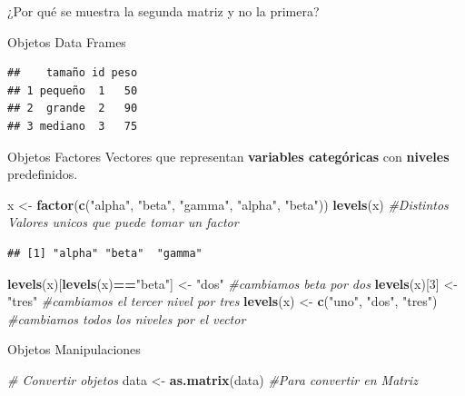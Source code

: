 \documentclass[
  ignorenonframetext,
]{beamer}
\newenvironment{Shaded}{\begin{snugshade}}{\end{snugshade}}
\newcommand{\CommentTok}[1]{\textcolor[rgb]{0.56,0.35,0.01}{\textit{#1}}}
\newcommand{\DecValTok}[1]{\textcolor[rgb]{0.00,0.00,0.81}{#1}}
\newcommand{\FunctionTok}[1]{\textcolor[rgb]{0.13,0.29,0.53}{\textbf{#1}}}
\newcommand{\NormalTok}[1]{#1}
\newcommand{\OtherTok}[1]{\textcolor[rgb]{0.56,0.35,0.01}{#1}}
\newcommand{\SpecialCharTok}[1]{\textcolor[rgb]{0.81,0.36,0.00}{\textbf{#1}}}
\newcommand{\StringTok}[1]{\textcolor[rgb]{0.31,0.60,0.02}{#1}}
\begin{document}
\begin{frame}[fragile]{¿Por qué se muestra la segunda matriz y no la
primera?}
\begin{block}{Objetos \textbar{} Data Frames}
\begin{verbatim}
##    tamaño id peso
## 1 pequeño  1   50
## 2  grande  2   90
## 3 mediano  3   75
\end{verbatim}
\end{block}

\begin{block}{Objetos \textbar{} Factores}
\protect\hypertarget{objetos-factores}{}
Vectores que representan \textbf{variables categóricas} con
\textbf{niveles} predefinidos.

\begin{Shaded}
\begin{Highlighting}[]
\NormalTok{x }\OtherTok{\textless{}{-}} \FunctionTok{factor}\NormalTok{(}\FunctionTok{c}\NormalTok{(}\StringTok{"alpha"}\NormalTok{, }\StringTok{"beta"}\NormalTok{, }\StringTok{"gamma"}\NormalTok{, }\StringTok{"alpha"}\NormalTok{, }\StringTok{"beta"}\NormalTok{))}
\FunctionTok{levels}\NormalTok{(x) }\CommentTok{\#Distintos Valores unicos que puede tomar un factor}
\end{Highlighting}
\end{Shaded}

\begin{verbatim}
## [1] "alpha" "beta"  "gamma"
\end{verbatim}

\begin{Shaded}
\begin{Highlighting}[]
\FunctionTok{levels}\NormalTok{(x)[}\FunctionTok{levels}\NormalTok{(x)}\SpecialCharTok{==}\StringTok{"beta"}\NormalTok{] }\OtherTok{\textless{}{-}} \StringTok{"dos"} \CommentTok{\#cambiamos beta por dos}
\FunctionTok{levels}\NormalTok{(x)[}\DecValTok{3}\NormalTok{] }\OtherTok{\textless{}{-}} \StringTok{"tres"}  \CommentTok{\#cambiamos el tercer nivel por tres}
\FunctionTok{levels}\NormalTok{(x) }\OtherTok{\textless{}{-}} \FunctionTok{c}\NormalTok{(}\StringTok{"uno"}\NormalTok{, }\StringTok{"dos"}\NormalTok{, }\StringTok{"tres"}\NormalTok{) }\CommentTok{\#cambiamos todos los niveles por el vector}
\end{Highlighting}
\end{Shaded}
\end{block}

\begin{block}{Objetos \textbar{} Manipulaciones}
\protect\hypertarget{objetos-manipulaciones}{}
\begin{Shaded}
\begin{Highlighting}[]
\CommentTok{\# Convertir objetos}
\NormalTok{data }\OtherTok{\textless{}{-}} \FunctionTok{as.matrix}\NormalTok{(data) }\CommentTok{\#Para convertir en Matriz}


\end{Highlighting}
\end{Shaded}
\end{block}
\end{frame}
\end{document}
